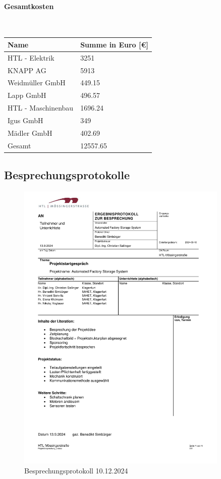 \paragraph{Gesamtkosten}\mbox{}\\
\begin{table}[H]
    \begin{tabular}{ll}
    Name               & Summe in Euro {[}€{]} \\\hline
    HTL - Elektrik     & 3251                  \\
    KNAPP AG           & 5913                  \\
    Weidmüller GmbH    & 449.15                \\
    Lapp GmbH          & 496.57                \\
    HTL - Maschinenbau & 1696.24               \\
    Igus GmbH          & 349                   \\
    Mädler GmbH        & 402.69                \\ \hline
    Gesamt             & 12557.65             
    \end{tabular}
 \end{table}

\subsection{Besprechungsprotokolle}

\begin{figure}[H]
    \includegraphics[width=0.9\textwidth]{../Protokolls/Projektbesprechung_0.pdf}
    \centering
    \caption{Besprechungsprotokoll 10.12.2024}
\end{figure}

